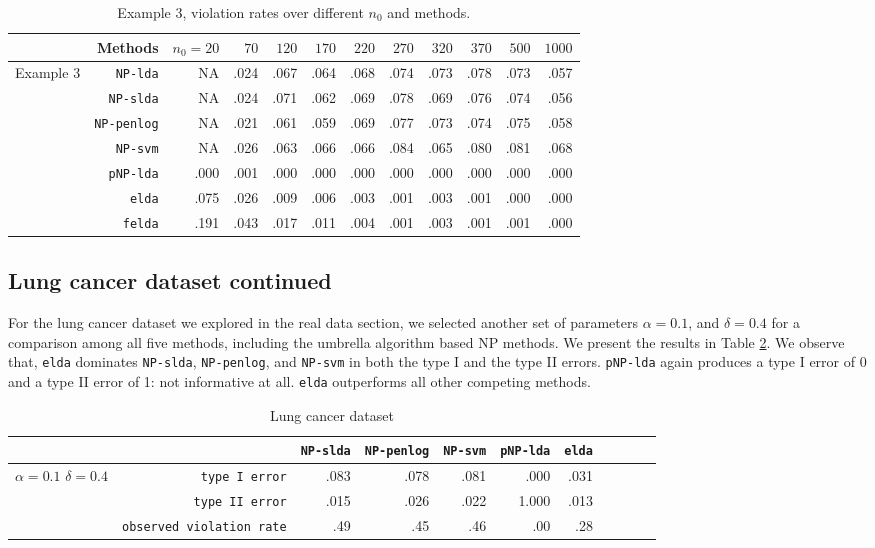 \documentclass[12pt]{article}
\numberwithin{equation}{section}
\theoremstyle{remark}
\newcommand{\1}{{\rm 1}\kern-0.24em{\rm I}}
\begin{document}
\begin{appendices}
\begin{table}[t]
\caption{Example 3,  violation rates over different $n_0$ and methods.\label{tb::simu3}}
\centering
\renewcommand{\arraystretch}{0.6}
\begin{tabular}{r|rrrrrrrrrrr}
\hline
&Methods&$n_0=20$&$70$&$120$&$170$&$220$&$270$&$320$&$370$&$500$&$1000$\\
\hline
\multirow{7}{2cm}{Example 3}
&\texttt{NP-lda}&NA&.024&.067&.064&.068&.074&.073&.078&.073&.057\\
 &\texttt{NP-slda}&NA&.024&.071&.062&.069&.078&.069&.076&.074&.056\\
&\texttt{NP-penlog}&NA&.021&.061&.059&.069&.077&.073&.074&.075&.058\\
&\texttt{NP-svm}&NA&.026&.063&.066&.066&.084&.065&.080&.081&.068\\
 &\texttt{pNP-lda}&.000&.001&.000&.000&.000&.000&.000&.000&.000&.000\\
 &\texttt{elda}&.075&.026&.009&.006&.003&.001&.003&.001&.000&.000\\
&\texttt{felda}&.191&.043&.017&.011&.004&.001&.003&.001&.001&.000\\
\hline
\end{tabular}
\end{table}

\subsection{Lung cancer dataset continued}
For the lung cancer dataset we explored in the real data section,  we selected another set of parameters $\alpha = 0.1$,  and $\delta=0.4$ for a comparison among all five methods, including the umbrella algorithm based NP methods.  We present the results in Table \ref{tb::realdata1-2}. We observe that,  \verb+elda+ dominates \verb+NP-slda+,   \verb+NP-penlog+,  and \verb+NP-svm+ in both the type I and the type II errors.  \verb+pNP-lda+ again produces a type I error of 0 and a type II error of 1: not informative at all.  \verb+elda+ outperforms all other competing methods.
 \begin{table}[t]
\caption{Lung cancer dataset  \label{tb::realdata1-2}}
\centering
\begin{tabular}{r|rrrrrrrrrr}
\hline
&&\texttt{NP-slda}&\texttt{NP-penlog}&\texttt{NP-svm}&\texttt{pNP-lda}&\texttt{elda}\\
\hline
\multirow{2}{2cm}{$\alpha=0.1$ $\delta=0.4$}
&\texttt{type I error}&.083&.078&.081&.000&.031\\
&\texttt{type II error}&.015&.026&.022&1.000&.013\\
&\texttt{observed violation rate}&.49&.45&.46&.00&.28\\
\hline
\end{tabular}
\end{table}

\end{appendices}






\end{document}
